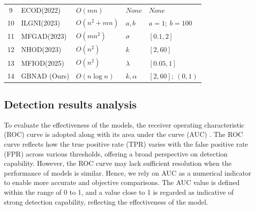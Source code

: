 \documentclass[times, review, 10pt]{elsarticle}
\begin{document}
\begin{table}[!htb]
{\begin{tabular}{@{}cllll@{}}
{ 9}   & { ECOD(2022) \cite{li2022ecod}}                                           & { $O(mn)$}                  & { $None$}           & { $None$}                                              \\
{ 10}  & { ILGNI(2023) \cite{li2023incomplete}} & { $O(n^2+mn)$}       & { $a,b$}      & { $a=1;~b=100$}                                   \\
{ 11}  & { MFGAD(2023) \cite{yuan2023mfgad}}                                          & { $O(mn^2)$}                  & { $\sigma$}   & { $[0.1,2]$}                                      \\
{ 12}  & { NHOD(2023) \cite{zhu2022high}}       & { $O(n^2)$}          & { $k$}        & { $[2,60]$}                                       \\
{ 13}  & { MFIOD(2025) \cite{chen2024fusing}}                                                & { $O(n^2)$}                  & { $\lambda$}           & { $[0.05,1]$}                                               \\
{ 14}  & { GBNAD (Ours)}                                         & { $O(n\log n)$}      & { $k,\alpha$} & { $[2,60];~(0,1)$}                                \\ \bottomrule
\end{tabular}%
}
\end{table}


\subsection{Detection results analysis}
To evaluate the effectiveness of the models, the receiver operating characteristic (ROC) curve is adopted along with its area under the curve (AUC) \cite{yuan2023anomaly}.
The ROC curve reflects how the true positive rate (TPR) varies with the false positive rate (FPR) across various thresholds, offering a broad perspective on detection capability. 
However, the ROC curve may lack sufficient resolution when the performance of models is similar. Hence, we rely on AUC as a numerical indicator to enable more accurate and objective comparisons.
The AUC value is defined within the range of 0 to 1, and a value close to 1 is regarded as indicative of strong detection capability, reflecting the effectiveness of the model.
\end{document}
